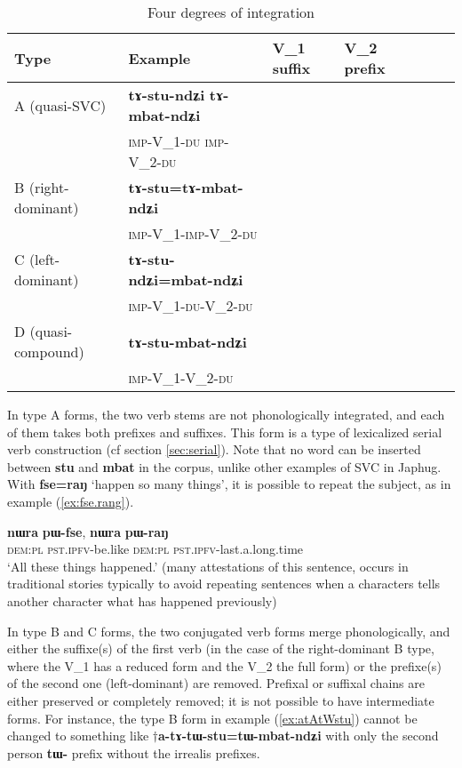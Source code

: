 \documentclass[oneside,a4paper,11pt]{article}
\newcommand{\ipa}[1]{{\phon\textbf{#1}}}
\newcommand{\Y}{\Checkmark}
\newcommand{\N}{}
\newcommand{\jpg}[2]{\ipa{#1} `#2'}
\newcommand{\refb}[1]{(\ref{#1})}
\begin{document}
\begin{table}[H]
\caption{Four degrees of integration} \centering \label{tab:four}
\begin{tabular}{lllllll}
\toprule
Type & Example & V_1 suffix & V_2 prefix \\
\midrule
A (quasi-SVC) & \ipa{tɤ-stu-ndʑi} \ipa{tɤ-mbat-ndʑi} &\Y &\Y \\
 &\textsc{imp}-V_1-\textsc{du}  \textsc{imp}-V_2-\textsc{du} \\
B (right-dominant) & \ipa{tɤ-stu=tɤ-mbat-ndʑi} &\N  &\Y \\
 &\textsc{imp}-V_1-\textsc{imp}-V_2-\textsc{du} \\
C (left-dominant) & \ipa{tɤ-stu-ndʑi=mbat-ndʑi} &\Y  &\N \\
 &\textsc{imp}-V_1-\textsc{du}-V_2-\textsc{du} \\
D (quasi-compound)& \ipa{tɤ-stu-mbat-ndʑi} &\N  &\N \\
 &\textsc{imp}-V_1-V_2-\textsc{du} \\
\bottomrule
\end{tabular}
\end{table}

In type A forms, the two verb stems are not phonologically integrated, and each of them takes both prefixes and suffixes. This form is a type of lexicalized serial verb construction (cf section \ref{sec:serial}). Note that  no word  can be inserted between \ipa{stu} and \ipa{mbat} in the corpus, unlike other examples of SVC in Japhug. With \jpg{fse=raŋ}{happen so many things}, it is possible to repeat the subject, as in example \refb{ex:fse.rang}.

\begin{exe}
\ex \label{ex:fse.rang}
\gll 
\ipa{nɯra} \ipa{pɯ-fse}, \ipa{nɯra} \ipa{pɯ-raŋ} \\
\textsc{dem:pl} \textsc{pst.ipfv}-be.like \textsc{dem:pl} \textsc{pst.ipfv}-last.a.long.time \\ 
\glt `All these things happened.' (many attestations of this sentence, occurs in traditional stories typically to avoid repeating sentences when a characters tells another character what has happened previously)
\end{exe}

In type B and C forms, the two conjugated verb forms merge phonologically, and either the suffixe(s) of the first verb (in the case of the right-dominant B type, where the V_1 has a reduced form and the V_2 the full form) or the prefixe(s) of the second one (left-dominant) are removed. Prefixal or suffixal chains are either preserved or completely removed; it is not possible to have intermediate forms. For instance, the type B form in example \refb{ex:atAtWstu} cannot be changed to something like $\dagger$\ipa{a-tɤ-tɯ-stu=tɯ-mbat-ndʑi} with only the second person \ipa{tɯ-} prefix without the irrealis prefixes.
\end{document}
